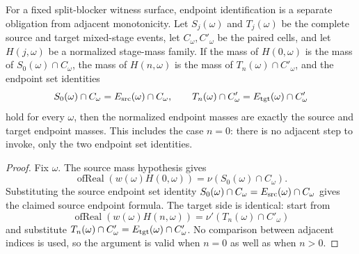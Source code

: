 \begin{helper}
For a fixed split-blocker witness surface, endpoint identification is a
separate obligation from adjacent monotonicity.  Let \(S_j(\omega)\) and
\(T_j(\omega)\) be the complete source and target mixed-stage events, let
\(C_\omega,C'_\omega\) be the paired cells, and let \(H(j,\omega)\) be a
normalized stage-mass family.  If the mass of \(H(0,\omega)\) is the mass of
\(S_0(\omega)\cap C_\omega\), the mass of \(H(n,\omega)\) is the mass of
\(T_n(\omega)\cap C'_\omega\), and the endpoint set identities
\[
S_0(\omega)\cap C_\omega=E_{\rm src}(\omega)\cap C_\omega,\qquad
T_n(\omega)\cap C'_\omega=E_{\rm tgt}(\omega)\cap C'_\omega
\]
hold for every \(\omega\), then the normalized endpoint masses are exactly
the source and target endpoint masses.  This includes the case \(n=0\):
there is no adjacent step to invoke, only the two endpoint set identities.
\end{helper}
\begin{proof}
Fix \(\omega\).  The source mass hypothesis gives
\[
\operatorname{ofReal}(w(\omega)H(0,\omega))
  =\nu(S_0(\omega)\cap C_\omega).
\]
Substituting the source endpoint set identity
\(S_0(\omega)\cap C_\omega=E_{\rm src}(\omega)\cap C_\omega\) gives the
claimed source endpoint formula.  The target side is identical: start from
\[
\operatorname{ofReal}(w(\omega)H(n,\omega))
  =\nu'(T_n(\omega)\cap C'_\omega)
\]
and substitute
\(T_n(\omega)\cap C'_\omega=E_{\rm tgt}(\omega)\cap C'_\omega\).
No comparison between adjacent indices is used, so the argument is valid
when \(n=0\) as well as when \(n>0\).
\end{proof}
